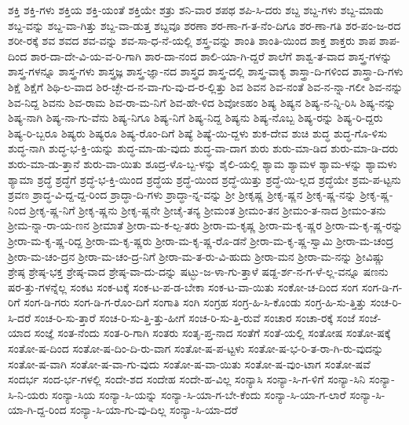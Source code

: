 {ಶಕ್ತಿ
ಶಕ್ತಿ-ಗಳು
ಶಕ್ತಿಯ
ಶಕ್ತಿ-ಯಂತೆ
ಶಕ್ತಿಯೇ
ಶತ್ರು
ಶನಿ-ವಾರ
ಶಪಥ
ಶಪಿ-ಸಿ-ದರು
ಶಬ್ದ
ಶಬ್ದ-ಗಳು
ಶಬ್ದ-ಮಾಡು
ಶಬ್ದ-ವನ್ನು
ಶಬ್ದ-ವಾ-ಗಿತ್ತು
ಶಬ್ದ-ವಾ-ಡುತ್ತ
ಶಬ್ದವೂ
ಶರಣಾ
ಶರ-ಣಾ-ಗ-ತ-ನೆಂ-ದಿಗೂ
ಶರ-ಣಾ-ಗತಿ
ಶರ-ಪಂ-ಜ-ರದ
ಶರೀ-ರಕ್ಕೆ
ಶವ
ಶವದ
ಶವ-ವನ್ನು
ಶವ-ಸಾ-ಧ-ನೆ-ಯಲ್ಲಿ
ಶಸ್ತ್ರ-ವನ್ನು
ಶಾಂತಿ
ಶಾಂತಿ-ಯಿಂದ
ಶಾಕ್ತ
ಶಾಕ್ತರು
ಶಾಪ
ಶಾಪ-ದಿಂದ
ಶಾರ-ದಾ-ದೇ-ವಿ-ಯ-ವ-ರಿ-ಗಾಗಿ
ಶಾರ-ದಾ-ನಂದ
ಶಾಲಿ-ಯಾ-ಗಿ-ದ್ದರೆ
ಶಾಲೆಗೆ
ಶಾಶ್ವ-ತ-ವಾದ
ಶಾಸ್ತ್ರ-ಗಳನ್ನು
ಶಾಸ್ತ್ರ-ಗಳನ್ನೂ
ಶಾಸ್ತ್ರ-ಗಳು
ಶಾಸ್ತ್ರಜ್ಞ
ಶಾಸ್ತ್ರ-ಜ್ಞಾ-ನದ
ಶಾಸ್ತ್ರದ
ಶಾಸ್ತ್ರ-ದಲ್ಲಿ
ಶಾಸ್ತ್ರ-ವಾಕ್ಯ
ಶಾಸ್ತ್ರಾ-ದಿ-ಗಳಿಂದ
ಶಾಸ್ತ್ರಾ-ದಿ-ಗಳು
ಶಿಕ್ಷೆ
ಶಿಕ್ಷೆಗೆ
ಶಿಥಿ-ಲ-ವಾದ
ಶಿರ-ಚ್ಛೇ-ದ-ನ-ವಾ-ಗು-ವು-ದ-ರ-ಲ್ಲಿತ್ತು
ಶಿವ
ಶಿವನ
ಶಿವ-ನಂತೆ
ಶಿವ-ನ-ನ್ನಾ-ಗಲೀ
ಶಿವ-ನನ್ನು
ಶಿವ-ನಿದ್ದ
ಶಿವನು
ಶಿವ-ರಾಮ
ಶಿವ-ರಾ-ಮ-ನಿಗೆ
ಶಿವ-ಹೇ-ಳಿದ
ಶಿವೋಽಹಂ
ಶಿಷ್ಯ
ಶಿಷ್ಯನ
ಶಿಷ್ಯ-ನ-ನ್ನಿ-ರಿಸಿ
ಶಿಷ್ಯ-ನನ್ನು
ಶಿಷ್ಯ-ನಾಗಿ
ಶಿಷ್ಯ-ನಾ-ಗು-ವೆನು
ಶಿಷ್ಯ-ನಿಗೂ
ಶಿಷ್ಯ-ನಿಗೆ
ಶಿಷ್ಯ-ನಿದ್ದ
ಶಿಷ್ಯನು
ಶಿಷ್ಯ-ನೊಬ್ಬ
ಶಿಷ್ಯ-ರನ್ನು
ಶಿಷ್ಯ-ರಿ-ದ್ದರು
ಶಿಷ್ಯ-ರಿ-ಬ್ಬರೂ
ಶಿಷ್ಯರು
ಶಿಷ್ಯರೂ
ಶಿಷ್ಯ-ರೊಂ-ದಿಗೆ
ಶಿಷ್ಯೆ
ಶಿಷ್ಯೆ-ಯಿ-ದ್ದಳು
ಶುಕ-ದೇವ
ಶುಚಿ
ಶುದ್ಧ
ಶುದ್ಧ-ಗೊ-ಳಿಸು
ಶುದ್ಧ-ನಾಗಿ
ಶುದ್ಧ-ಭ-ಕ್ತಿ-ಯನ್ನು
ಶುದ್ಧ-ಮಾ-ಡು-ವುದು
ಶುದ್ಧ-ವಾ-ದಾಗ
ಶುರು
ಶುರು-ಮಾ-ಡಿದ
ಶುರು-ಮಾ-ಡಿ-ದರು
ಶುರು-ಮಾ-ಡು-ತ್ತಾನೆ
ಶುರು-ವಾ-ಯಿತು
ಶೂದ್ರ-ಳೊ-ಬ್ಬ-ಳನ್ನು
ಶೈಲಿ-ಯಲ್ಲಿ
ಶ್ಯಾಮ
ಶ್ಯಾಮಳ
ಶ್ಯಾಮ-ಳನ್ನು
ಶ್ಯಾಮಳು
ಶ್ಯಾಮಾ
ಶ್ರದ್ಧೆ
ಶ್ರದ್ಧೆಗೆ
ಶ್ರದ್ಧೆ-ಭ-ಕ್ತಿ-ಯಿಂದ
ಶ್ರದ್ಧೆಯ
ಶ್ರದ್ಧೆ-ಯಿಂದ
ಶ್ರದ್ಧೆ-ಯಿತ್ತು
ಶ್ರದ್ಧೆ-ಯಿ-ಲ್ಲದ
ಶ್ರದ್ಧೆಯೇ
ಶ್ರಮ-ಪ-ಟ್ಟನು
ಶ್ರವಣ
ಶ್ರಾದ್ಧ-ವಿ-ದ್ದ-ದ್ದ-ರಿಂದ
ಶ್ರಾದ್ಧಾ-ದಿ-ಗಳು
ಶ್ರಾದ್ಧಾ-ನ್ನ-ವನ್ನು
ಶ್ರೀ
ಶ್ರೀಕೃಷ್ಣ
ಶ್ರೀಕೃ-ಷ್ಣನ
ಶ್ರೀಕೃ-ಷ್ಣ-ನನ್ನು
ಶ್ರೀಕೃ-ಷ್ಣ-ನಿಂದ
ಶ್ರೀಕೃ-ಷ್ಣ-ನಿಗೆ
ಶ್ರೀಕೃ-ಷ್ಣನು
ಶ್ರೀಕೃ-ಷ್ಣನೇ
ಶ್ರೀಚೈ-ತನ್ಯ
ಶ್ರೀಮಂತ
ಶ್ರೀಮಂ-ತನ
ಶ್ರೀಮಂ-ತ-ನಾದ
ಶ್ರೀಮಂ-ತನು
ಶ್ರೀಮ-ನ್ನಾ-ರಾ-ಯ-ಣನ
ಶ್ರೀಮಾತೆ
ಶ್ರೀರಾ-ಮ-ಕ-ಲ್ಪ-ತರು
ಶ್ರೀರಾ-ಮ-ಕೃಷ್ಣ
ಶ್ರೀರಾ-ಮ-ಕೃ-ಷ್ಣರ
ಶ್ರೀರಾ-ಮ-ಕೃ-ಷ್ಣ-ರನ್ನು
ಶ್ರೀರಾ-ಮ-ಕೃ-ಷ್ಣ-ರಿದ್ದ
ಶ್ರೀರಾ-ಮ-ಕೃ-ಷ್ಣರು
ಶ್ರೀರಾ-ಮ-ಕೃ-ಷ್ಣ-ರೊ-ಡನೆ
ಶ್ರೀರಾ-ಮ-ಕೃ-ಷ್ಣ-ಸ್ವಾಮಿ
ಶ್ರೀರಾ-ಮ-ಚಂದ್ರ
ಶ್ರೀರಾ-ಮ-ಚಂ-ದ್ರನ
ಶ್ರೀರಾ-ಮ-ಚಂ-ದ್ರ-ನಿಗೆ
ಶ್ರೀರಾ-ಮ-ತ-ರು-ವಿ-ಹುದು
ಶ್ರೀರಾ-ಮನ
ಶ್ರೀರಾ-ಮ-ನನ್ನು
ಶ್ರೀವಿಷ್ಣು
ಶ್ರೇಷ್ಠ
ಶ್ರೇಷ್ಠ-ಭಕ್ತ
ಶ್ರೇಷ್ಠ-ವಾದ
ಶ್ರೇಷ್ಠ-ವಾ-ದು-ದನ್ನು
ಷಟ್ಭು-ಜ-ಳಾ-ಗು-ತ್ತಾಳೆ
ಷಡ್ದ-ರ್ಶ-ನ-ಗ-ಳೆ-ಲ್ಲ-ವನ್ನೂ
ಷಣನು
ಷರ-ತ್ತು-ಗಳನ್ನೆಲ್ಲ
ಸಂಕಟ
ಸಂಕ-ಟಕ್ಕೆ
ಸಂಕ-ಟ-ಪ-ಡ-ಬೇಕಾ
ಸಂಕ-ಟ-ವಾ-ಯಿತು
ಸಂಕೋ-ಚ-ದಿಂದ
ಸಂಗ
ಸಂಗ-ಡಿ-ಗ-ರಿಗೆ
ಸಂಗ-ಡಿ-ಗರು
ಸಂಗ-ಡಿ-ಗ-ರೊಂ-ದಿಗೆ
ಸಂಗಾತಿ
ಸಂಗಿ
ಸಂಗ್ರಹ
ಸಂಗ್ರ-ಹಿ-ಸಿ-ಕೊಂಡು
ಸಂಗ್ರ-ಹಿ-ಸು-ತ್ತಿತ್ತು
ಸಂಚ-ರಿ-ಸಿ-ದರೆ
ಸಂಚ-ರಿ-ಸು-ತ್ತಾರೆ
ಸಂಚ-ರಿ-ಸು-ತ್ತಿ-ತ್ತು-ಹೀಗೆ
ಸಂಚ-ರಿ-ಸು-ತ್ತಿ-ರುವೆ
ಸಂಚಾರ
ಸಂಚಾ-ರಕ್ಕೆ
ಸಂಜೆ
ಸಂಜೆ-ಯಾದ
ಸಂಜ್ಞೆ
ಸಂತ-ನೆಂದು
ಸಂತ-ರಿ-ಗಾಗಿ
ಸಂತರು
ಸಂತೃ-ಪ್ತ-ನಾದ
ಸಂತೆಗೆ
ಸಂತೆ-ಯಲ್ಲಿ
ಸಂತೋಷ
ಸಂತೋ-ಷಕ್ಕೆ
ಸಂತೋ-ಷ-ದಿಂದ
ಸಂತೋ-ಷ-ದಿಂ-ದಿ-ರು-ವಾಗ
ಸಂತೋ-ಷ-ಪ-ಟ್ಟಳು
ಸಂತೋ-ಷ-ಭ-ರಿ-ತ-ರಾ-ಗಿ-ರು-ವುದನ್ನು
ಸಂತೋ-ಷ-ವಾಗಿ
ಸಂತೋ-ಷ-ವಾ-ಗು-ವುದು
ಸಂತೋ-ಷ-ವಾ-ಯಿತು
ಸಂತೋ-ಷ-ವುಂ-ಟಾಗ
ಸಂತೋ-ಷವೆ
ಸಂದರ್ಭ
ಸಂದ-ರ್ಭ-ಗಳಲ್ಲಿ
ಸಂದೇ-ಶದ
ಸಂದೇಹ
ಸಂದೇ-ಹ-ವಿಲ್ಲ
ಸಂನ್ಯಾಸಿ
ಸಂನ್ಯಾ-ಸಿ-ಗ-ಳಿಗೆ
ಸಂನ್ಯಾ-ಸಿನಿ
ಸಂನ್ಯಾ-ಸಿ-ನಿ-ಯರು
ಸಂನ್ಯಾ-ಸಿಯ
ಸಂನ್ಯಾ-ಸಿ-ಯನ್ನು
ಸಂನ್ಯಾ-ಸಿ-ಯಾ-ಗ-ಬೇ-ಕೆಂದು
ಸಂನ್ಯಾ-ಸಿ-ಯಾ-ಗ-ಲಾರೆ
ಸಂನ್ಯಾ-ಸಿ-ಯಾ-ಗಿ-ದ್ದ-ರಿಂದ
ಸಂನ್ಯಾ-ಸಿ-ಯಾ-ಗು-ವು-ದಿಲ್ಲ
ಸಂನ್ಯಾ-ಸಿ-ಯಾ-ದರೆ
}
